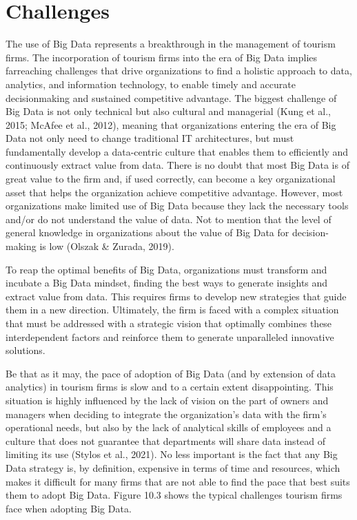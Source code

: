 \documentclass[
  letterpaper,
  DIV=11,
  numbers=noendperiod]{scrreprt}
\begin{document}
\hypertarget{challenges-1}{%
\section{Challenges}\label{challenges-1}}

The use of Big Data represents a breakthrough in the management of
tourism firms. The incorporation of tourism firms into the era of Big
Data implies farreaching challenges that drive organizations to find a
holistic approach to data, analytics, and information technology, to
enable timely and accurate decisionmaking and sustained competitive
advantage. The biggest challenge of Big Data is not only technical but
also cultural and managerial (Kung et al., 2015; McAfee et al., 2012),
meaning that organizations entering the era of Big Data not only need to
change traditional IT architectures, but must fundamentally develop a
data-centric culture that enables them to efficiently and continuously
extract value from data. There is no doubt that most Big Data is of
great value to the firm and, if used correctly, can become a key
organizational asset that helps the organization achieve competitive
advantage. However, most organizations make limited use of Big Data
because they lack the necessary tools and/or do not understand the value
of data. Not to mention that the level of general knowledge in
organizations about the value of Big Data for decision-making is low
(Olszak \& Zurada, 2019).

To reap the optimal benefits of Big Data, organizations must transform
and incubate a Big Data mindset, finding the best ways to generate
insights and extract value from data. This requires firms to develop new
strategies that guide them in a new direction. Ultimately, the firm is
faced with a complex situation that must be addressed with a strategic
vision that optimally combines these interdependent factors and
reinforce them to generate unparalleled innovative solutions.

Be that as it may, the pace of adoption of Big Data (and by extension of
data analytics) in tourism firms is slow and to a certain extent
disappointing. This situation is highly influenced by the lack of vision
on the part of owners and managers when deciding to integrate the
organization's data with the firm's operational needs, but also by the
lack of analytical skills of employees and a culture that does not
guarantee that departments will share data instead of limiting its use
(Stylos et al., 2021). No less important is the fact that any Big Data
strategy is, by definition, expensive in terms of time and resources,
which makes it difficult for many firms that are not able to find the
pace that best suits them to adopt Big Data. Figure 10.3 shows the
typical challenges tourism firms face when adopting Big Data.
\end{document}
